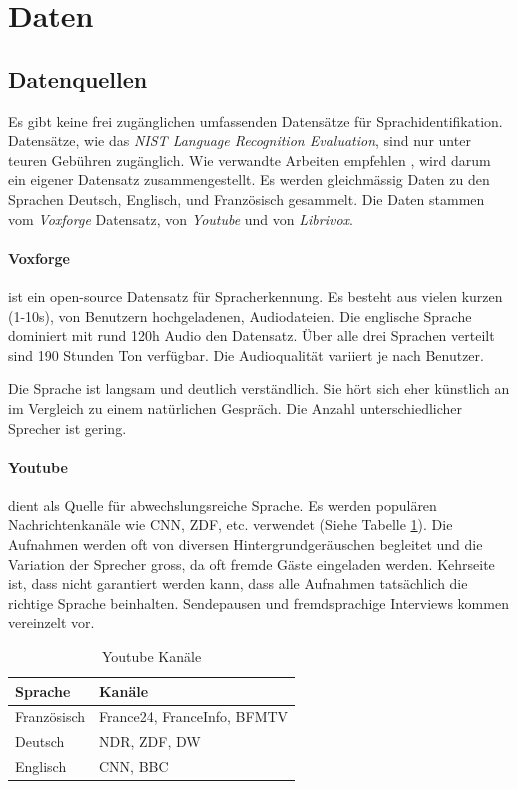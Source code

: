 \section{Daten}


\subsection{Datenquellen}
Es gibt keine frei zugänglichen umfassenden Datensätze für Sprachidentifikation. Datensätze, wie das \textit{NIST Language Recognition Evaluation}\cite{nist}, sind nur unter teuren Gebühren zugänglich. Wie verwandte Arbeiten empfehlen \cite{iLID}, wird darum ein eigener Datensatz zusammengestellt. Es werden gleichmässig Daten zu den Sprachen Deutsch, Englisch, und Französisch gesammelt. Die Daten stammen vom \textit{Voxforge}\cite{voxforge} Datensatz, von \textit{Youtube}\cite{youtube} und von \textit{Librivox}\cite{librivox}.

\paragraph{Voxforge} ist ein open-source Datensatz für Spracherkennung. Es besteht aus vielen kurzen (1-10s), von Benutzern hochgeladenen, Audiodateien. Die englische Sprache dominiert mit rund 120h Audio den Datensatz. Über alle drei Sprachen verteilt sind 190 Stunden Ton verfügbar. Die Audioqualität variiert je nach Benutzer.

Die Sprache ist langsam und deutlich verständlich. Sie hört sich eher künstlich an im Vergleich zu einem natürlichen Gespräch. Die Anzahl unterschiedlicher Sprecher ist gering.

\paragraph{Youtube}dient als Quelle für abwechslungsreiche Sprache. Es werden populären Nachrichtenkanäle wie CNN, ZDF, etc. verwendet (Siehe Tabelle \ref{tab:channels}). Die Aufnahmen werden oft von diversen Hintergrundgeräuschen begleitet und die Variation der Sprecher gross, da oft fremde Gäste eingeladen werden. Kehrseite ist, dass nicht garantiert werden kann, dass alle Aufnahmen tatsächlich die richtige Sprache beinhalten. Sendepausen und fremdsprachige Interviews kommen vereinzelt vor.
\begin{table}[h]
        \centering
        \begin{tabular}[t]{l || l}
        Sprache & Kanäle \\
        \hline \hline
        Französisch & France24, FranceInfo, BFMTV\\
        Deutsch & NDR, ZDF, DW\\
        Englisch & CNN,  BBC
        \end{tabular}
        \caption{Youtube Kanäle}
        \label{tab:channels}
\end{table}

